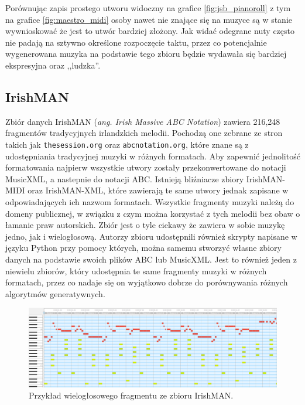 \documentclass[data-science]{agh-wi} %
\begin{document}
Porównując zapis prostego utworu widoczny na grafice \ref*{fig:jsb_pianoroll} z tym na grafice \ref*{fig:maestro_midi} osoby nawet nie znające się na muzyce są w stanie wywnioskować że jest to utwór bardziej złożony. Jak widać odegrane nuty często nie padają na sztywno określone rozpoczęcie taktu, przez co potencjalnie wygenerowana muzyka na podstawie tego zbioru będzie wydawała się bardziej ekspresyjna oraz ,,ludzka''.

\subsection{IrishMAN}
Zbiór danych IrishMAN (\textit{ang. Irish Massive ABC Notation}) \cite{irishman} zawiera 216,248 fragmentów tradycyjnych irlandzkich melodii. Pochodzą one zebrane ze stron takich jak \texttt{thesession.org} oraz \texttt{abcnotation.org}, które znane są z udostępniania tradycyjnej muzyki w różnych formatach. Aby zapewnić jednolitość formatowania najpierw wszystkie utwory zostały przekonwertowane do notacji MusicXML, a nastepnie do notacji ABC. Istnieją bliźniacze zbiory IrishMAN-MIDI oraz IrishMAN-XML, które zawierają te same utwory jednak zapisane w odpowiadających ich nazwom formatach. Wszystkie fragmenty muzyki należą do domeny publicznej, w związku z czym można korzystać z tych melodii bez obaw o łamanie praw autorskich. Zbiór jest o tyle ciekawy że zawiera w sobie muzykę jedno, jak i wielogłosową. Autorzy zbioru udostępnili również skrypty napisane w języku Python przy pomocy których, można samemu stworzyć własne zbiory danych na podstawie swoich plików ABC lub MusicXML. Jest to również jeden z niewielu zbiorów, który udostępnia te same fragmenty muzyki w różnych formatach, przez co nadaje się on wyjątkowo dobrze do porównywania różnych algorytmów generatywnych.

\begin{figure}[ht!]
    \begin{center}
        \includegraphics[width=0.9\linewidth]{./img/irishman_midi.png}
    \end{center}
    \caption{Przykład wielogłosowego fragmentu ze zbioru IrishMAN.}\label{fig:irish_midi}
\end{figure}
\end{document}
